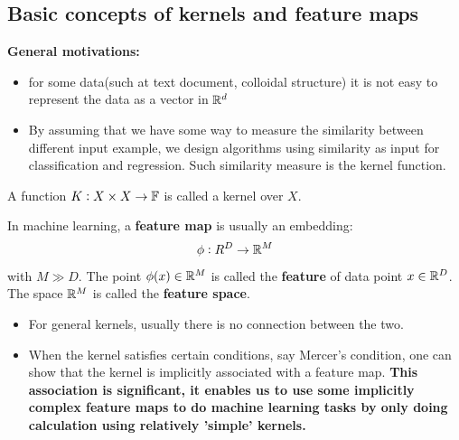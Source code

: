 \begin{refsection}
\subsection{Basic concepts of kernels and feature maps}
\begin{mdframed}
	\textbf{\cite[481]{murphy2012machine} General motivations:}
	\begin{itemize}
		\item for some data(such at text document, colloidal structure) it is not easy to represent the data as a vector in $\mathbb{R}^d$
		\item By assuming that we have some way to measure the similarity between different input example, we design algorithms using similarity as input for classification and regression. Such similarity measure is the kernel function.
	\end{itemize}
\end{mdframed}


\begin{definition}[kernel] 
	\cite[90]{mohri2012foundations}A function $K:X\times X \to \mathbb{F}$ is called a kernel over $X$.
\end{definition}


\begin{definition}
	In machine learning, a \textbf{feature map} is usually an embedding:
	$$\phi:R^D\to\mathbb{R}^M$$
	with $M \gg D$. The point $\phi(x) \in \mathbb{R}^M$ is called the \textbf{feature} of data point $x\in \mathbb{R}^D$.
	The space $\mathbb{R}^M$ is called the \textbf{feature space}.
\end{definition}

\begin{remark}
	\begin{itemize}\hfill
		\item For general kernels, usually there is no connection between the two.
		\item When the kernel satisfies certain conditions, say Mercer's condition, one can show that the kernel is implicitly associated with a feature map. \textbf{This association is significant, it enables us to use some implicitly complex feature maps to do machine learning tasks by only doing calculation using relatively 'simple' kernels.}
	\end{itemize}
\end{remark}




\end{refsection}
